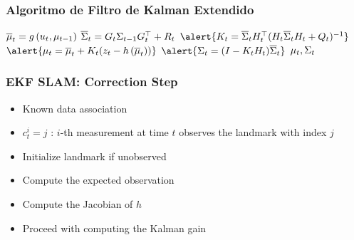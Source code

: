 \begin{frame}
    \frametitle{Algoritmo de Filtro de Kalman Extendido}
    
    \begin{algorithmic}[1]
        \State $\overline{\mu}_{t} = g\left( u_{t}, \mu_{t-1} \right)$
        \State $\overline{\Sigma}_{t} = G_{t} \Sigma_{t-1} G_{t}^{\top}+R_{t}$
        \Statex
        \State $\alert{\kalmanGain_{t} = \overline{\covariance}_{t} \observationModelJacobian_{t}^{\top} (\observationModelJacobian_{t} \overline{\covariance}_{t}  \observationModelJacobian_{t} + \observationModelCovariance_{t})^{-1}}$
        \State $\alert{\mu_{t} = \overline{\mu}_{t} + \kalmanGain_{t} (\observation_{t} - \observationModelFunction{\overline{\mu}_{t}})}$
        \State $\alert{\covariance_{t} =  (I - \kalmanGain_{t} \observationModelJacobian_{t}) \overline{\covariance}_{t}}$
        \State \Return $\mu_{t}, \Sigma_{t}$
    \EndProcedure
    \end{algorithmic}
\end{frame}

\begin{frame}
    \frametitle{EKF SLAM: Correction Step}

    \begin{itemize}
        \item Known data association
        \item $c_{t}^{i} = j$ : $i$-th measurement at time $t$ observes the landmark with index $j$
        \item Initialize landmark if unobserved
        \item Compute the expected observation
        \item Compute the Jacobian of $h$
        \item Proceed with computing the Kalman gain
    \end{itemize}

\end{frame}

